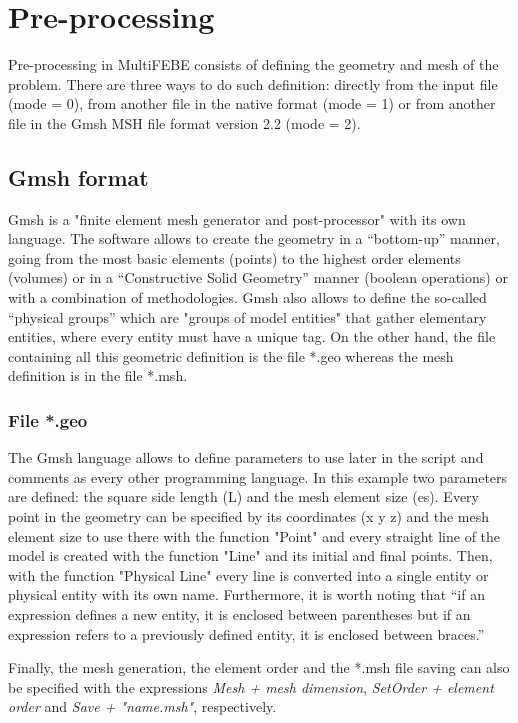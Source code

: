 \documentclass[a4]{article}
\begin{document}
\section{Pre-processing} 

Pre-processing in MultiFEBE consists of defining the geometry and mesh of the problem. There are three ways to do such definition: directly from the input file (mode = 0), from another file in the native format (mode = 1) or from another file in the Gmsh MSH file format version 2.2 (mode = 2).

\subsection{Gmsh format}

Gmsh \cite{gmsh, gmshweb} is a "finite element mesh generator and post-processor" with its own language. The software allows to create the geometry in a “bottom-up” manner, going from the most basic elements (points) to the highest order elements (volumes) or in a “Constructive Solid Geometry” manner (boolean operations) or with a combination of methodologies. Gmsh also allows to define  the so-called “physical groups” which are "groups of model entities" that gather elementary entities, where every entity must have a unique tag. On the other hand, the file containing all this geometric definition is the file *.geo whereas the mesh definition is in the file *.msh. 

\subsubsection{File *.geo}

The Gmsh language allows to define parameters to use later in the script and comments as every other programming language. In this example two parameters are defined: the square side length (L) and the mesh element size (es). Every point in the geometry can be specified by its coordinates (x y z) and the mesh element size to use there with the function "Point" and every straight line of the model is created with the function "Line" and its initial and final points. Then, with the function "Physical Line" every line is converted into a single entity or physical entity with its own name. Furthermore, it is worth noting that “if an expression defines a new entity, it is enclosed between parentheses but if an expression refers to a previously defined entity, it is enclosed between braces.” \cite{gmshweb} 

Finally, the mesh generation, the element order and the *.msh file saving can also be specified with the expressions \textit{Mesh + mesh dimension}, \textit{SetOrder + element order} and \textit{Save + "name.msh"}, respectively.
\end{document}
